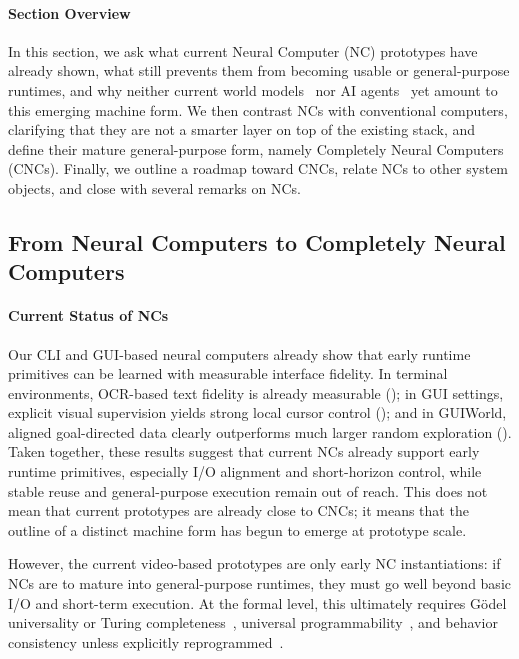 
\paragraph{Section Overview}
In this section, we ask what current Neural Computer (NC) prototypes have already shown, what still prevents them from becoming usable or general-purpose runtimes, and why neither current world models~\citep{ha2018world,openai2024sora,polyak2024movie,deepmind_veo_2025} nor AI agents~\citep{hong2023metagpt,claudeComputerTool,zhuge2026ai} yet amount to this emerging machine form.
We then contrast NCs with conventional computers, clarifying that they are not a smarter layer on top of the existing stack, and define their mature general-purpose form, namely Completely Neural Computers (CNCs).
Finally, we outline a roadmap toward CNCs, relate NCs to other system objects, and close with several remarks on NCs.

\subsection{From Neural Computers to Completely Neural Computers}

\paragraph{Current Status of NCs}
Our CLI and GUI-based neural computers already show that early runtime primitives can be learned with measurable interface fidelity. In terminal environments, OCR-based text fidelity is already measurable (); in GUI settings, explicit visual supervision yields strong local cursor control (); and in GUIWorld, aligned goal-directed data clearly outperforms much larger random exploration (). Taken together, these results suggest that current NCs already support early runtime primitives, especially I/O alignment and short-horizon control, while stable reuse and general-purpose execution remain out of reach.
This does not mean that current prototypes are already close to CNCs; it means that the outline of a distinct machine form has begun to emerge at prototype scale.

However, the current video-based prototypes are only early NC instantiations: if NCs are to mature into general-purpose runtimes, they must go well beyond basic I/O and short-term execution.
At the formal level, this ultimately requires Gödel universality or Turing completeness~\citep{Goedel:31,Church:35,turing1936computable,siegelmann1992computational}, universal programmability~\citep{von1993first,wilkes1981best}, and behavior consistency unless explicitly reprogrammed~\citep{queloz2025explainability}. 

